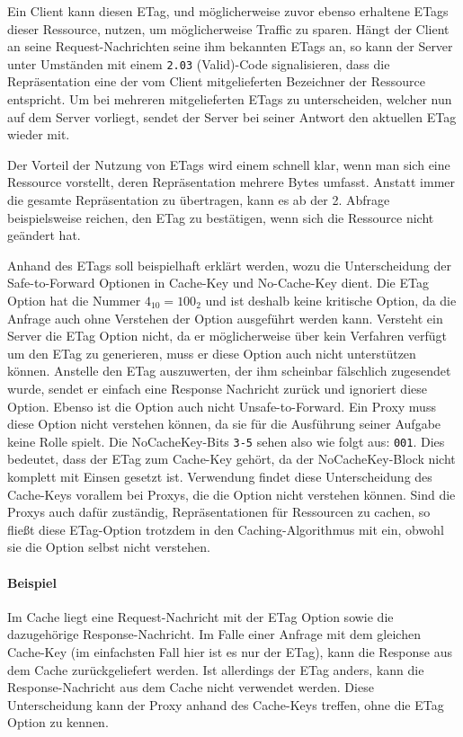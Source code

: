 Ein Client kann diesen ETag, und möglicherweise zuvor ebenso erhaltene ETags
dieser Ressource, nutzen, um möglicherweise Traffic zu sparen. Hängt der Client an
seine Request-Nachrichten seine ihm bekannten ETags an, so kann der Server
unter Umständen mit einem \verb!2.03! (Valid)-Code signalisieren, dass die
Repräsentation eine der vom Client mitgelieferten Bezeichner der Ressource
entspricht. Um bei mehreren mitgelieferten ETags zu unterscheiden, welcher nun
auf dem Server vorliegt, sendet der Server bei seiner Antwort den aktuellen
ETag wieder mit.

Der Vorteil der Nutzung von ETags wird einem schnell klar, wenn man sich eine
Ressource vorstellt, deren Repräsentation mehrere Bytes umfasst. Anstatt immer
die gesamte Repräsentation zu übertragen, kann es ab der 2. Abfrage
beispielsweise reichen, den ETag zu bestätigen, wenn sich die Ressource nicht
geändert hat.

Anhand des ETags soll beispielhaft erklärt werden, wozu die Unterscheidung der
Safe-to-Forward Optionen in Cache-Key und No-Cache-Key dient.
Die ETag Option hat die Nummer $4_{10}=100_{2}$ und ist deshalb keine kritische Option, da die
Anfrage auch ohne Verstehen der Option ausgeführt werden kann. Versteht ein
Server die ETag Option nicht, da er möglicherweise über kein Verfahren verfügt
um den ETag zu generieren, muss er diese Option auch nicht unterstützen können.
Anstelle den ETag auszuwerten, der ihm scheinbar fälschlich zugesendet wurde,
sendet er einfach eine Response Nachricht zurück und ignoriert diese Option.
Ebenso ist die Option auch nicht Unsafe-to-Forward. Ein Proxy muss diese Option
nicht verstehen können, da sie für die Ausführung seiner Aufgabe keine Rolle
spielt. Die NoCacheKey-Bits \verb!3-5! sehen also wie folgt aus: \verb!001!. Dies bedeutet, dass
der ETag zum Cache-Key gehört, da der NoCacheKey-Block nicht komplett mit
Einsen gesetzt ist. Verwendung findet diese Unterscheidung des Cache-Keys
vorallem bei Proxys, die die Option nicht verstehen können. Sind die
Proxys auch dafür zuständig, Repräsentationen für Ressourcen zu cachen, so
fließt diese ETag-Option trotzdem in den Caching-Algorithmus mit ein, obwohl sie
die Option selbst nicht verstehen.
\paragraph{Beispiel}
Im Cache liegt eine Request-Nachricht mit der ETag Option sowie die dazugehörige
Response-Nachricht.
Im Falle einer Anfrage mit dem gleichen Cache-Key (im einfachsten Fall hier ist es nur der ETag),
kann die Response aus dem Cache zurückgeliefert werden.
Ist allerdings der ETag anders, kann die Response-Nachricht aus dem Cache nicht verwendet werden.
Diese Unterscheidung kann der Proxy anhand des Cache-Keys treffen, ohne die ETag Option zu kennen.
